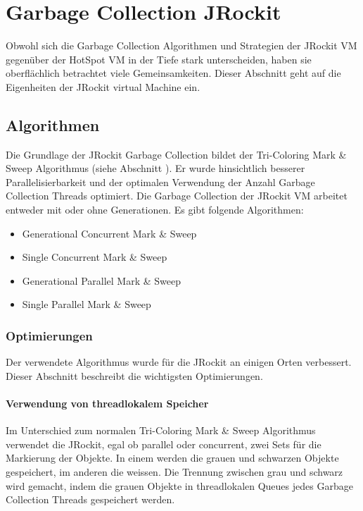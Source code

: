 \chapter{Garbage Collection JRockit}\label{jrockit garbage collection}
Obwohl sich die Garbage Collection Algorithmen und Strategien der JRockit VM gegenüber der HotSpot VM in der Tiefe stark unterscheiden, haben sie oberflächlich betrachtet viele Gemeinsamkeiten. Dieser Abschnitt geht auf die Eigenheiten der JRockit virtual Machine ein. 

\section{Algorithmen}
Die Grundlage der JRockit Garbage Collection bildet der Tri-Coloring Mark \& Sweep Algorithmus (siehe Abschnitt ). Er wurde hinsichtlich besserer Parallelisierbarkeit und der optimalen Verwendung der Anzahl Garbage Collection Threads optimiert. Die Garbage Collection der JRockit VM arbeitet entweder mit oder ohne Generationen. Es gibt folgende Algorithmen:

\begin{itemize}
	\item Generational Concurrent Mark \& Sweep
	\item Single Concurrent Mark \& Sweep
	\item Generational Parallel Mark \& Sweep	
	\item Single Parallel Mark \& Sweep
\end{itemize}

\subsection{Optimierungen}
Der verwendete Algorithmus wurde für die JRockit an einigen Orten verbessert. Dieser Abschnitt beschreibt die wichtigsten Optimierungen.

\subsubsection{Verwendung von threadlokalem Speicher}
Im Unterschied zum normalen Tri-Coloring Mark \& Sweep Algorithmus verwendet die JRockit, egal ob parallel oder concurrent, zwei Sets für die Markierung der Objekte. In einem werden die grauen und schwarzen Objekte gespeichert, im anderen die weissen. Die Trennung zwischen grau und schwarz wird gemacht, indem die grauen Objekte in threadlokalen Queues jedes Garbage Collection Threads gespeichert werden. 

